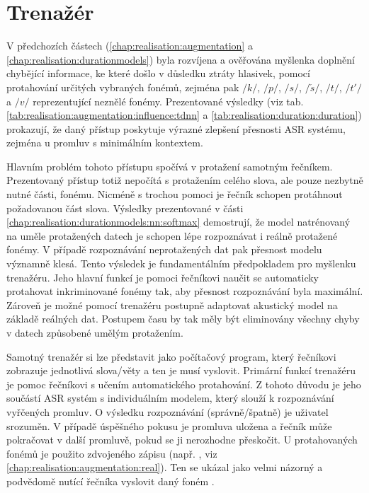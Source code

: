 \section{Trenažér}
\label{chap:realisation:trainer}

V předchozích částech (\ref{chap:realisation:augmentation} a \ref{chap:realisation:durationmodels}) byla rozvíjena a ověřována myšlenka doplnění chybějící informace, ke které došlo v důsledku ztráty hlasivek, pomocí protahování určitých vybraných fonémů, zejména pak $/k/$, $/p/$, $/s/$, $/\check{s}/$, $/t/$, $/t'/$ a $/v/$ reprezentující neznělé fonémy. Prezentované výsledky (viz tab. \ref{tab:realisation:augmentation:influence:tdnn} a \ref{tab:realisation:duration:duration}) prokazují, že daný přístup poskytuje výrazné zlepšení přesnosti ASR systému, zejména u promluv s minimálním kontextem.

Hlavním problém tohoto přístupu spočívá v protažení samotným řečníkem. Prezentovaný přístup totiž nepočítá s protažením celého slova, ale pouze nezbytně nutné části, fonému. Nicméně s trochou pomoci je řečník schopen protáhnout požadovanou část slova. Výsledky prezentované v části \ref{chap:realisation:durationmodels:nn:softmax} demostrují, že model natrénovaný na uměle protažených datech je schopen lépe rozpoznávat i reálně protažené fonémy. V případě rozpoznávání neprotažených dat pak přesnost modelu významně klesá. Tento výsledek je fundamentálním předpokladem pro myšlenku trenažéru. Jeho hlavní funkcí je pomoci řečníkovi naučit se automaticky protahovat inkriminované fonémy tak, aby přesnost rozpoznávání byla maximální. Zároveň je možné pomocí trenažéru postupně adaptovat akustický model na základě reálných dat. Postupem času by tak měly být eliminovány všechny chyby v datech způsobené umělým protažením.

Samotný trenažér si lze představit jako počítačový program, který řečníkovi zobrazuje jednotlivá slova/věty a ten je musí vyslovit. Primární funkcí trenažéru je pomoc řečníkovi s učením automatického protahování. Z tohoto důvodu je jeho součástí ASR systém s individuálním modelem, který slouží k rozpoznávání vyřčených promluv. O výsledku rozpoznávání (správně/špatně) je uživatel srozuměn. V případě úspěšného pokusu je promluva uložena a řečník může pokračovat v další promluvě, pokud se ji nerozhodne přeskočit. U protahovaných fonémů je použito zdvojeného zápisu (např. \textit{}, viz \ref{chap:realisation:augmentation:real}). Ten se ukázal jako velmi názorný a podvědomě nutící řečníka vyslovit daný foném .


